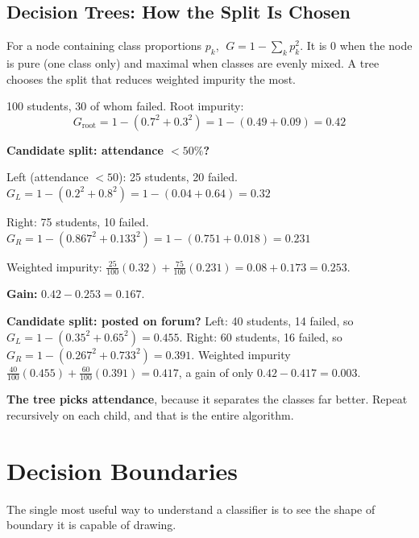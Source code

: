 \subsection{Decision Trees: How the Split Is Chosen}

\begin{definitionbox}
For a node containing class proportions $p_k$,
$\;G = 1 - \sum_k p_k^2$. It is 0 when the node is pure (one class only) and
maximal when classes are evenly mixed. A tree chooses the split that reduces
weighted impurity the most.
\end{definitionbox}

\begin{worked}
100 students, 30 of whom failed. Root impurity:
\[
G_{\text{root}} = 1 - (0.7^2 + 0.3^2) = 1 - (0.49 + 0.09) = 0.42
\]

\textbf{Candidate split: attendance $< 50\%$?}
\begin{tight}
  \item Left (attendance $<50$): 25 students, 20 failed.
        $G_L = 1 - (0.2^2 + 0.8^2) = 1 - (0.04+0.64) = 0.32$
  \item Right: 75 students, 10 failed.
        $G_R = 1 - (0.867^2 + 0.133^2) = 1 - (0.751+0.018) = 0.231$
\end{tight}
Weighted impurity: $\frac{25}{100}(0.32) + \frac{75}{100}(0.231) = 0.08 + 0.173 = 0.253$.

\textbf{Gain:} $0.42 - 0.253 = 0.167$.

\smallskip
\textbf{Candidate split: posted on forum?}
Left: 40 students, 14 failed, so $G_L = 1-(0.35^2+0.65^2) = 0.455$.
Right: 60 students, 16 failed, so $G_R = 1-(0.267^2+0.733^2) = 0.391$.
Weighted impurity $\frac{40}{100}(0.455) + \frac{60}{100}(0.391) = 0.417$,
a gain of only $0.42 - 0.417 = 0.003$.

\smallskip
\textbf{The tree picks attendance}, because it separates the classes far better.
Repeat recursively on each child, and that is the entire algorithm.
\end{worked}

\section{Decision Boundaries}

The single most useful way to understand a classifier is to see the shape of
boundary it is capable of drawing.

